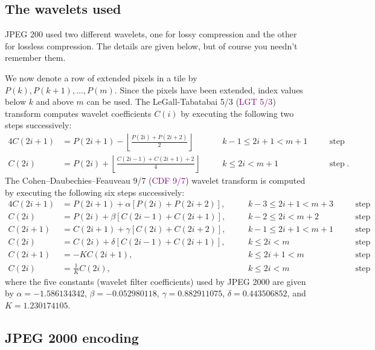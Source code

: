 \documentclass[a4paper, 11pt, openany]{book}
\numberwithin{equation}{section}
\theoremstyle{plain}
\theoremstyle{definition}
\newcommand{\Define}[1]{\textcolor{purple}{#1}}
\begin{document}
\subsection{The wavelets used}

JPEG 200 used two different wavelets, one for lossy compression and the other for lossless compression. The details are given below, but of course you needn't remember them.

We now denote a row of extended pixels in a tile by $P(k), P(k+1), \dots , P(m)$. Since the pixels have been extended, index values below $k$ and above $m$ can be used. The LeGall-Tabatabai 5/3 (\Define{LGT 5/3}) transform computes wavelet coefficients $C(i)$ by executing the following two steps successively:
\begin{alignat*}{4}
    C(2i + 1) &= P(2i + 1) - \left\lfloor \frac{P(2i) + P(2i + 2)}{2} \right\rfloor &\quad& k - 1 \le 2i + 1 < m+ 1 &\quad& \text{step 1}\\
    C(2i) &= P(2i) + \left\lfloor \frac{ C(2i - 1) + C(2i + 1) + 2 }{4} \right\rfloor &\quad&  k \le 2i < m+ 1 &\quad& \text{step 2}.
\end{alignat*}
The Cohen–Daubechies–Feauveau 9/7 (\Define{CDF 9/7}) wavelet transform is computed by executing the following six steps successively:
\begin{alignat*}{4}
C(2i + 1) &= P(2i + 1) +  \alpha [P(2i) + P(2i + 2)], &\quad & k-3 \le 2i+1 < m+3 & \quad& \text{step 1}\\
C(2i) &= P(2i) + \beta[C(2i - 1) + C(2i + 1)], &\quad& k-2 \le 2i < m+2 &\quad& \text{step 2}\\
C(2i + 1) &= C(2i + 1) + \gamma[C(2i) + C(2i + 2)], &\quad& k-1 \le 2i+1 < m+1 &\quad& \text{step 3}\\
C(2i) &= C(2i) + \delta[C(2i - 1) + C(2i + 1)], &\quad& k \le 2i < m &\quad& \text{step 4}\\
C(2i + 1) &= -K C(2i + 1), &\quad& k \le 2i + 1 < m &\quad& \text{step 5}\\
C(2i) &=  \frac{1}{K} C(2i), &\quad& k \le 2i < m &\quad& \text{step 6}
\end{alignat*}
where the five constants (wavelet filter coefficients) used by JPEG 2000 are given by
$\alpha = -1.586134342$, $\beta = -0.052980118$, $\gamma = 0.882911075$, $\delta = 0.443506852$, and $K = 1.230174105$.



\subsection{JPEG 2000 encoding}
\end{document}
